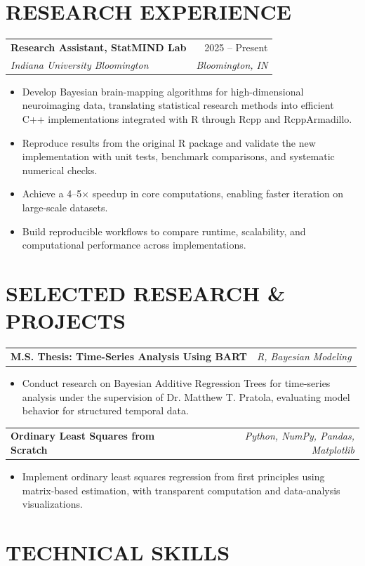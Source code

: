 \documentclass[10pt,letterpaper]{article}
\makeatletter
\newcommand{\resumeEntry}[4]{%
	\begin{tabularx}{\textwidth}{@{}Xr@{}}
		\textbf{#1} & #2 \\
		\textit{#3} & \textit{#4}
	\end{tabularx}%
}
\newcommand{\projectEntry}[2]{%
	\begin{tabularx}{\textwidth}{@{}Xr@{}}
		\textbf{#1} & \textit{#2}
	\end{tabularx}%
}
\newenvironment{resumeItems}{%
	\begin{itemize}[
		label=\textbullet,
		leftmargin=14pt,
		labelsep=5pt,
		itemsep=0.5pt,
		topsep=1.0pt,
		parsep=0pt,
		partopsep=0pt
	]
}{\end{itemize}}
\makeatother
\begin{document}
\section*{RESEARCH EXPERIENCE}

\resumeEntry
	{Research Assistant, StatMIND Lab}
	{2025 -- Present}
	{Indiana University Bloomington}
	{Bloomington, IN}

\begin{resumeItems}
	\item Develop Bayesian brain-mapping algorithms for high-dimensional neuroimaging data, translating statistical research methods into efficient C++ implementations integrated with R through Rcpp and RcppArmadillo.
	\item Reproduce results from the original R package and validate the new implementation with unit tests, benchmark comparisons, and systematic numerical checks.
	\item Achieve a 4--5$\times$ speedup in core computations, enabling faster iteration on large-scale datasets.
	\item Build reproducible workflows to compare runtime, scalability, and computational performance across implementations.
\end{resumeItems}

\section*{SELECTED RESEARCH \& PROJECTS}

\projectEntry
	{M.S. Thesis: Time-Series Analysis Using BART}
	{R, Bayesian Modeling}
\begin{resumeItems}
	\item Conduct research on Bayesian Additive Regression Trees for time-series analysis under the supervision of Dr. Matthew T. Pratola, evaluating model behavior for structured temporal data.
\end{resumeItems}

\vspace{0.7pt}
\projectEntry
	{Ordinary Least Squares from Scratch}
	{Python, NumPy, Pandas, Matplotlib}
\begin{resumeItems}
	\item Implement ordinary least squares regression from first principles using matrix-based estimation, with transparent computation and data-analysis visualizations.
\end{resumeItems}

\section*{TECHNICAL SKILLS}
\end{document}
